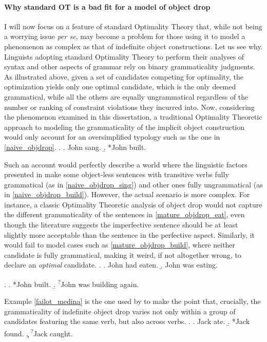 \paragraph{Why standard OT is a bad fit for a model of object drop} 
I will now focus on a feature of standard Optimality Theory that, while not being a worrying issue \textit{per se}, may become a problem for those using it to model a phenomenon as complex as that of indefinite object constructions. Let us see why.\\
Linguists adopting standard Optimality Theory to perform their analyses of syntax and other aspects of grammar rely on binary grammaticality judgments. As illustrated above, given a set of candidates competing for optimality, the optimization yields only one optimal candidate, which is the only deemed grammatical, while all the others are equally ungrammatical regardless of the number or ranking of constraint violations they incurred into. Now, considering the phenomenon examined in this dissertation, a traditional Optimality Theoretic approach to modeling the grammaticality of the implicit object construction would only account for an oversimplified typology such as the one in \ref{naive_objdrop}. 
\ex. \label{naive_objdrop} \a. \label{naive_objdrop_sing} John sang.
\b. \label{naive_objdrop_build} *John built.

Such an account would perfectly describe a world where the linguistic factors presented in  make some object-less sentences with transitive verbs fully grammatical (as in \ref{naive_objdrop_sing}) and other ones fully ungrammatical (as in \ref{naive_objdrop_build}). However, the actual scenario is more complex. For instance, a classic Optimality Theoretic analysis of object drop would not capture the different grammaticality of the sentences in \ref{mature_objdrop_eat}, even though the literature suggests the imperfective sentence should be at least slightly more acceptable than the sentence in the perfective aspect. Similarly, it would fail to model cases such as \ref{mature_objdrop_build}, where neither candidate is fully grammatical, making it weird, if not altogether wrong, to declare an \textit{optimal} candidate.
\ex. \label{mature_objdrop_eat} \a. John had eaten.
\b. John was eating.

\ex. \label{mature_objdrop_build} \a. *John built.
\b. \textsuperscript{?}John was building again.

Example \ref{failot_medina} is the one used by \textcite[62]{Medina2007} to make the point that, crucially, the grammaticality of indefinite object drop varies not only within a group of candidates featuring the same verb, but also across verbs.
\ex. \label{failot_medina} \a. Jack ate.
\b. *Jack found.
\c. \textsuperscript{?}Jack caught.

